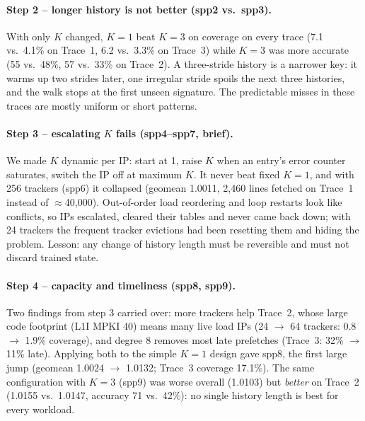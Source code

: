 \documentclass[11pt,a4paper]{article}
\theoremstyle{themethm}
\theoremstyle{themedef}
\theoremstyle{themeex}
\theoremstyle{themerem}
\begin{document}
\paragraph{Step 2 -- longer history is not better (spp2 vs.\ spp3).} With only
$K$ changed, $K=1$ beat $K=3$ on coverage on every trace (7.1 vs.\ 4.1\% on
Trace~1, 6.2 vs.\ 3.3\% on Trace~3) while $K=3$ was more accurate (55 vs.\ 48\%,
57 vs.\ 33\% on Trace~2). A three-stride history is a narrower key: it warms up
two strides later, one irregular stride spoils the next three histories, and
the walk stops at the first unseen signature. The predictable misses in these
traces are mostly uniform or short patterns.

\paragraph{Step 3 -- escalating $K$ fails (spp4--spp7, brief).} We made $K$
dynamic per IP: start at 1, raise $K$ when an entry's error counter saturates,
switch the IP off at maximum $K$. It never beat fixed $K=1$, and with 256
trackers (spp6) it collapsed (geomean 1.0011, 2{,}460 lines fetched on Trace~1
instead of $\approx$40{,}000). Out-of-order load reordering and loop restarts
look like conflicts, so IPs escalated, cleared their tables and never came
back down; with 24 trackers the frequent tracker evictions had been resetting
them and hiding the problem. Lesson: any change of history length must be
reversible and must not discard trained state.

\paragraph{Step 4 -- capacity and timeliness (spp8, spp9).} Two findings from
step 3 carried over: more trackers help Trace~2, whose large code footprint
(L1I MPKI 40) means many live load IPs (24 $\to$ 64 trackers: 0.8 $\to$ 1.9\%
coverage), and degree 8 removes most late prefetches (Trace~3: 32\% $\to$ 11\%
late). Applying both to the simple $K=1$ design gave spp8, the first large jump
(geomean 1.0024 $\to$ 1.0132; Trace~3 coverage 17.1\%). The same configuration
with $K=3$ (spp9) was worse overall (1.0103) but \emph{better} on Trace~2
(1.0155 vs.\ 1.0147, accuracy 71 vs.\ 42\%): no single history length is best
for every workload.
\end{document}

